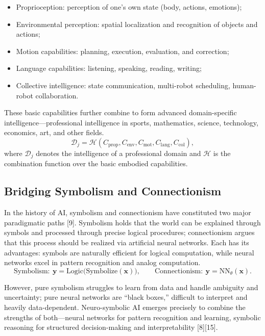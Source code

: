 \documentclass[12pt,a4paper]{article}
\begin{document}
\begin{itemize}
\item Proprioception: perception of one's own state (body, actions, emotions);
\item Environmental perception: spatial localization and recognition of objects and actions;
\item Motion capabilities: planning, execution, evaluation, and correction;
\item Language capabilities: listening, speaking, reading, writing;
\item Collective intelligence: state communication, multi-robot scheduling, human-robot collaboration.
\end{itemize}

These basic capabilities further combine to form advanced domain-specific intelligence\allowbreak{}---professional intelligence in sports, mathematics, science, technology, economics, art, and other fields.
\begin{equation}
\mathcal{D}_{j}=\mathcal{H}\left(C_{\mathrm{prop}},C_{\mathrm{env}},C_{\mathrm{mot}},C_{\mathrm{lang}},C_{\mathrm{col}}\right),
\label{eq:domain-intelligence}
\end{equation}
where $\mathcal{D}_j$ denotes the intelligence of a professional domain and $\mathcal{H}$ is the combination function over the basic embodied capabilities.

\subsection{Bridging Symbolism and Connectionism}
In the history of AI, symbolism and connectionism have constituted two major paradigmatic paths [9]. Symbolism holds that the world can be explained through symbols and processed through precise logical procedures; connectionism argues that this process should be realized via artificial neural networks. Each has its advantages: symbols are naturally efficient for logical computation, while neural networks excel in pattern recognition and analog computation.
\begin{equation}
\text{Symbolism}:\ \mathbf{y}=\mathrm{Logic}\bigl(\mathrm{Symbolize}(\mathbf{x})\bigr),\qquad
\text{Connectionism}:\ \mathbf{y}=\mathrm{NN}_{\theta}(\mathbf{x}).
\label{eq:two-paradigms}
\end{equation}

However, pure symbolism struggles to learn from data and handle ambiguity and uncertainty; pure neural networks are ``black boxes,'' difficult to interpret and heavily data-dependent. Neuro-symbolic AI emerges precisely to combine the strengths of both---neural networks for pattern recognition and learning, symbolic reasoning for structured decision-making and interpretability [8][15].
\end{document}
